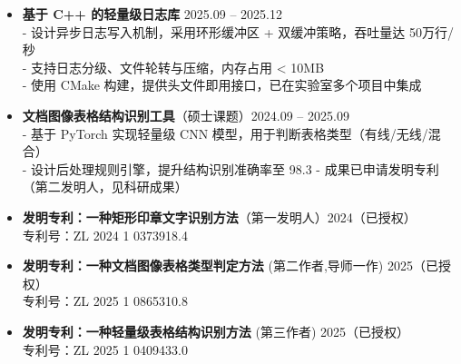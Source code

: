 \documentclass[zh]{resume}
\begin{document}
\begin{itemize}
  \item \textbf{基于 C++ 的轻量级日志库} \hfill 2025.09 – 2025.12 \\
        - 设计异步日志写入机制，采用环形缓冲区 + 双缓冲策略，吞吐量达 50万行/秒 \\
        - 支持日志分级、文件轮转与压缩，内存占用 < 10MB \\
        - 使用 CMake 构建，提供头文件即用接口，已在实验室多个项目中集成

  \item \textbf{文档图像表格结构识别工具}（硕士课题）\hfill 2024.09 – 2025.09 \\
        - 基于 PyTorch 实现轻量级 CNN 模型，用于判断表格类型（有线/无线/混合） \\
        - 设计后处理规则引擎，提升结构识别准确率至 98.3%
        - 成果已申请发明专利（第二发明人，见科研成果）
\end{itemize}


\begin{itemize}
  \setlength{\itemsep}{0.4ex}
  \renewcommand{\labelitemi}{\color{gray}\tiny$\bullet$}
  
  \item \textbf{发明专利：一种矩形印章文字识别方法}（第一发明人）\hfill 2024（已授权）\\
      专利号：ZL 2024 1 0373918.4
  \item \textbf{发明专利：一种文档图像表格类型判定方法} (第二作者,导师一作) \hfill 2025（已授权） \\
      专利号：ZL 2025 1 0865310.8 
  \item \textbf{发明专利：一种轻量级表格结构识别方法} (第三作者) \hfill 2025（已授权）  \\
      专利号：ZL 2025 1 0409433.0     
\end{itemize}
\end{document}
